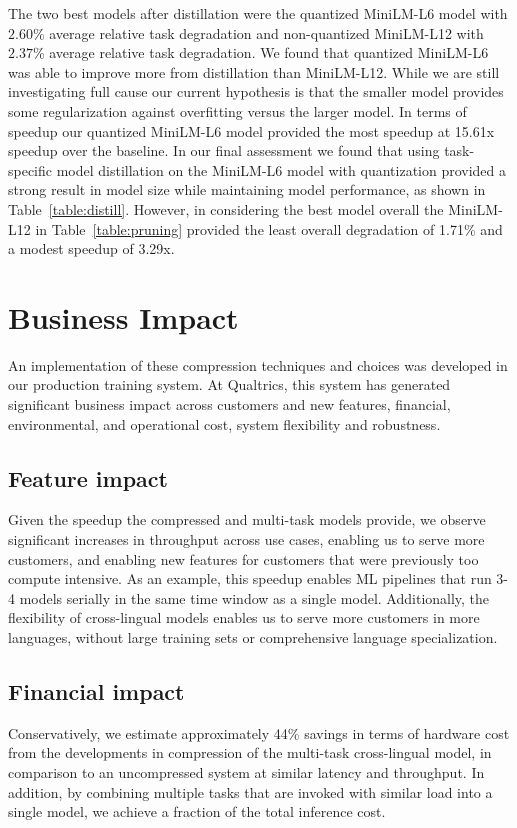 The two best models after distillation were the quantized MiniLM-L6 model with $2.60$\% average relative task degradation and non-quantized MiniLM-L12 with $2.37$\% average relative task degradation.
We found that quantized MiniLM-L6 was able to improve more from distillation than MiniLM-L12.
While we are still investigating full cause our current hypothesis is that the smaller model provides some regularization against overfitting versus the larger model.
In terms of speedup our quantized MiniLM-L6 model provided the most speedup at 15.61x speedup over the baseline.
In our final assessment we found that using task-specific model distillation on the MiniLM-L6 model with quantization provided a strong result in model size while maintaining model performance, as shown in Table~\ref{table:distill}.
However, in considering the best model overall the MiniLM-L12 in Table~\ref{table:pruning} provided the least overall degradation of 1.71\% and a modest speedup of 3.29x.

\section*{Business Impact}
An implementation of these compression techniques and choices was developed in our production training system.
At Qualtrics, this system has generated significant business impact across customers and new features, financial, environmental, and operational cost, system flexibility and robustness.

\subsection*{Feature impact}
Given the speedup the compressed and multi-task models provide, we observe significant increases in throughput across use cases, enabling us to serve more customers, and enabling new features for customers that were previously too compute intensive.
As an example, this speedup enables ML pipelines that run 3-4 models serially in the same time window as a single model.
Additionally, the flexibility of cross-lingual models enables us to serve more customers in more languages, without large training sets or comprehensive language specialization.

\subsection*{Financial impact}
Conservatively, we estimate approximately 44\% savings in terms of hardware cost from the developments in compression of the multi-task cross-lingual model, in comparison to an uncompressed system at similar latency and throughput.
In addition, by combining multiple tasks that are invoked with similar load into a single model, we achieve a fraction of the total inference cost.

